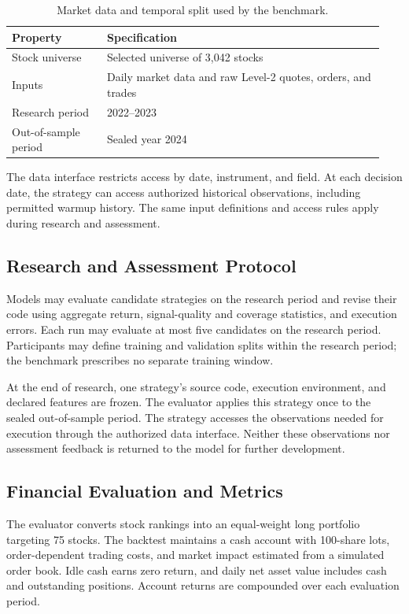\begin{table}[htbp]
\centering
\small
\caption{Market data and temporal split used by the benchmark.}
\label{tab:benchmark_data}
\begin{tabular}{@{}p{0.24\linewidth}p{0.70\linewidth}@{}}
\toprule
Property & Specification \\
\midrule
Stock universe & Selected universe of 3,042 stocks \\
Inputs & Daily market data and raw Level-2 quotes, orders, and trades \\
Research period & 2022--2023 \\
Out-of-sample period & Sealed year 2024 \\
\bottomrule
\end{tabular}
\end{table}

The data interface restricts access by date, instrument, and field. At each decision date, the strategy can access authorized historical observations, including permitted warmup history. The same input definitions and access rules apply during research and assessment.

\subsection{Research and Assessment Protocol}
\label{sec:protocol}

Models may evaluate candidate strategies on the research period and revise their code using aggregate return, signal-quality and coverage statistics, and execution errors. Each run may evaluate at most five candidates on the research period. Participants may define training and validation splits within the research period; the benchmark prescribes no separate training window.

At the end of research, one strategy's source code, execution environment, and declared features are frozen. The evaluator applies this strategy once to the sealed out-of-sample period. The strategy accesses the observations needed for execution through the authorized data interface. Neither these observations nor assessment feedback is returned to the model for further development.


\subsection{Financial Evaluation and Metrics}
\label{sec:financial}
\label{sec:scoring}

The evaluator converts stock rankings into an equal-weight long portfolio targeting 75 stocks. The backtest maintains a cash account with 100-share lots, order-dependent trading costs, and market impact estimated from a simulated order book. Idle cash earns zero return, and daily net asset value includes cash and outstanding positions. Account returns are compounded over each evaluation period.

